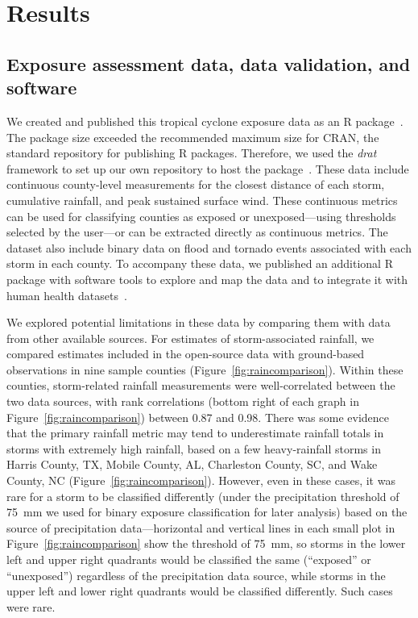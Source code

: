 \section*{Results}

\subsection*{Exposure assessment data, data validation, and software}

We created and published this tropical cyclone exposure data as an R
package~\parencite{hurricaneexposuredata}.  The package size exceeded the
recommended maximum size for \ac{CRAN}, the standard repository for publishing
R packages. Therefore, we used the \textit{drat} framework to set up our own
repository to host the package~\parencite{anderson2017hosting}. These data
include continuous county-level measurements for the closest distance of each
storm, cumulative rainfall, and peak sustained surface wind. These continuous
metrics can be used for classifying counties as exposed or unexposed---using
thresholds selected by the user---or can be extracted directly as continuous
metrics. The dataset also include binary data on flood and tornado events
associated with each storm in each county. To accompany these data, we
published an additional R package with software tools to explore and map the
data and to integrate it with human health
datasets~\parencite{hurricaneexposure}.

We explored potential limitations in these data by comparing them with data
from other available sources.  For estimates of storm-associated rainfall, we
compared estimates included in the open-source data with ground-based
observations in nine sample counties (Figure~\ref{fig:raincomparison}). Within
these counties, storm-related rainfall measurements were well-correlated
between the two data sources, with rank correlations (bottom right of each
graph in Figure~\ref{fig:raincomparison}) between 0.87 and 0.98. There was some
evidence that the primary rainfall metric may tend to underestimate rainfall
totals in storms with extremely high rainfall, based on a few heavy-rainfall
storms in Harris County, TX, Mobile County, AL, Charleston County, SC, and Wake
County, NC (Figure~\ref{fig:raincomparison}). However, even in these cases, it
was rare for a storm to be classified differently (under the precipitation
threshold of 75~\si{\milli\metre} we used for binary exposure classification
for later analysis) based on the source of precipitation data---horizontal and
vertical lines in each small plot in Figure~\ref{fig:raincomparison} show the
threshold of 75~\si{\milli\metre}, so storms in the lower left and upper right
quadrants would be classified the same (``exposed'' or ``unexposed'')
regardless of the precipitation data source, while storms in the upper left and
lower right quadrants would be classified differently. Such cases were rare.

